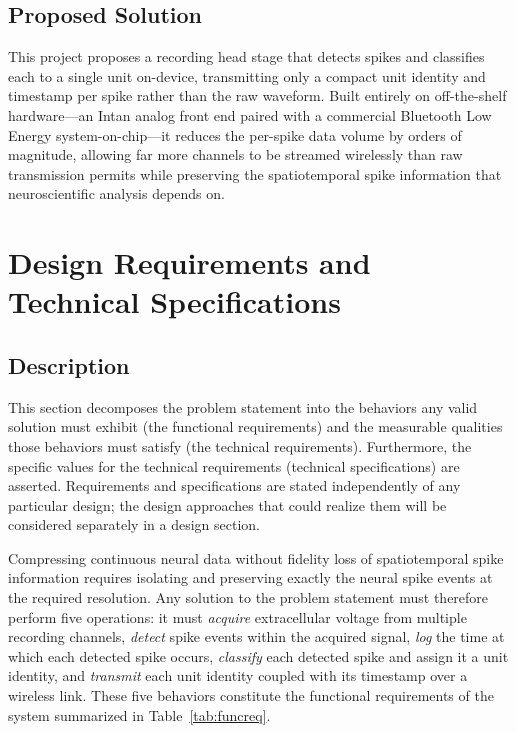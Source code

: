 \documentclass[11pt]{article}
\begin{document}
\subsection{Proposed Solution}
This project proposes a recording head stage that detects spikes and classifies each to a
single unit on-device, transmitting only a compact unit identity and timestamp per spike
rather than the raw waveform. Built entirely on off-the-shelf hardware---an Intan analog
front end paired with a commercial Bluetooth Low Energy system-on-chip---it reduces the
per-spike data volume by orders of magnitude, allowing far more channels to be streamed
wirelessly than raw transmission permits while preserving the spatiotemporal spike
information that neuroscientific analysis depends on.

\section{Design Requirements and Technical Specifications}

\subsection{Description}
This section decomposes the problem statement into the behaviors any valid solution must exhibit
(the functional requirements) and the measurable qualities those behaviors must satisfy (the
technical requirements). Furthermore, the specific values for the technical requirements
(technical specifications) are asserted. Requirements and specifications are stated
independently of any particular design; the design approaches that could realize them will
be considered separately in a design section.

Compressing continuous neural data without fidelity loss of spatiotemporal spike
information requires isolating and preserving exactly the neural spike events at the
required resolution. Any solution to the problem statement must therefore
perform five operations: it must \emph{acquire} extracellular voltage from multiple
recording channels, \emph{detect} spike events within the acquired signal, \emph{log} the
time at which each detected spike occurs, \emph{classify} each detected spike and assign it
a unit identity, and \emph{transmit} each unit identity coupled with its timestamp over a
wireless link. These five behaviors constitute the functional requirements of the system
summarized in Table~\ref{tab:funcreq}.
\end{document}

